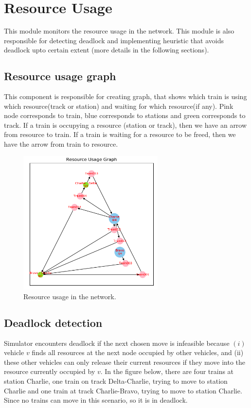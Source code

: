 \chapter{Resource Usage}

This module monitors the resource usage in the network. This module is also responsible for detecting deadlock and 
implementing heuristic that avoids deadlock upto certain extent (more details in the following sections). 
  
\section{Resource usage graph}
This component is responsible 
for creating graph, that shows which train is using which resource(track or station) and waiting for 
which resource(if any). Pink node corresponds to train, blue corresponds to stations and green corresponds 
to track. If a train is occupying a resource (station or track), then we have an arrow from resource to train.
If a train is waiting for a resource to be freed, then we have the arrow from train to resource.

\begin{figure}[h]
    \centering
    \includegraphics[width=0.65\textwidth]{resource}
    \caption{ Resource usage in the network.  }
    \label{image-myimage6}
\end{figure}

\section{Deadlock detection}
Simulator encounters deadlock if the next chosen move is
infeasible because $(i)$ vehicle $v$ finds all resources at the
next node occupied by other vehicles, and (ii) these other
vehicles can only release their current resources if they
move into the resource currently occupied by $v$. 
In the figure below, there are four trains at station Charlie, one train on track Delta-Charlie, trying to move to station Charlie 
and one train at track Charlie-Bravo, trying to move to station Charlie. Since no trains can move in this scenario, so it is in deadlock.

